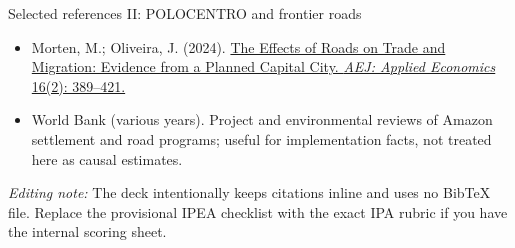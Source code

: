\documentclass[aspectratio=169,10pt]{beamer}
\begin{document}
\begin{frame}{Selected references II: POLOCENTRO and frontier roads}
\begin{itemize}
  \item Morten, M.; Oliveira, J. (2024). \href{https://doi.org/10.1257/app.20180487}{The Effects of Roads on Trade and Migration: Evidence from a Planned Capital City. \textit{AEJ: Applied Economics} 16(2): 389--421.}
  \item World Bank (various years). Project and environmental reviews of Amazon settlement and road programs; useful for implementation facts, not treated here as causal estimates.
\end{itemize}
\vfill
\tiny\color{Muted}\textit{Editing note:} The deck intentionally keeps citations inline and uses no BibTeX file. Replace the provisional IPEA checklist with the exact IPA rubric if you have the internal scoring sheet.
\end{frame}
\end{document}

